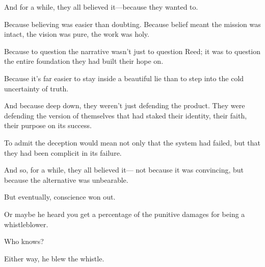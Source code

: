\medskip

And for a while, they all believed it—because they wanted to.

Because believing was easier than doubting.
Because belief meant the mission was intact, the vision was pure, the work was holy.

Because to question the narrative wasn’t just to question Reed; it was to question the entire foundation they had built their hope on.

Because it’s far easier to stay inside a beautiful lie than to step into the cold uncertainty of truth.

And because deep down, they weren’t just defending the product.
They were defending the version of themselves that had staked their identity, their faith, their purpose on its success.

To admit the deception would mean not only that the system had failed,
but that they had been complicit in its failure.

And so, for a while, they all believed it—
not because it was convincing,
but because the alternative was unbearable.

But eventually, conscience won out.

Or maybe he heard you get a percentage of the punitive damages for being a whistleblower.

Who knows?

Either way, he blew the whistle.

